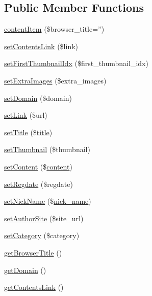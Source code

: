 \subsection*{Public Member Functions}
\begin{DoxyCompactItemize}
\item 
\hyperlink{classcontentItem_a6d43634cb803585fa2a0feb13f63fad4}{content\-Item} (\$browser\-\_\-title='')
\item 
\hyperlink{classcontentItem_afe78ae4ab14d74305c86d27570d9a7f8}{set\-Contents\-Link} (\$link)
\item 
\hyperlink{classcontentItem_ab18307a6068a6cdde94369976fe730f4}{set\-First\-Thumbnail\-Idx} (\$first\-\_\-thumbnail\-\_\-idx)
\item 
\hyperlink{classcontentItem_a8f635dff719c18bf5e969b13ca901c74}{set\-Extra\-Images} (\$extra\-\_\-images)
\item 
\hyperlink{classcontentItem_a61b6be878a0183cd1c3dfde8f29d5c20}{set\-Domain} (\$domain)
\item 
\hyperlink{classcontentItem_aad5f15eead8728ad5e2636740c4ff145}{set\-Link} (\$url)
\item 
\hyperlink{classcontentItem_a5a29426d7878c413cd6d63e930ce0a0f}{set\-Title} (\$\hyperlink{ko_8install_8php_a5b072c5fd1d2228c6ba5cee13cd142e3}{title})
\item 
\hyperlink{classcontentItem_a0145a758535658fa776871bfd675be15}{set\-Thumbnail} (\$thumbnail)
\item 
\hyperlink{classcontentItem_ad7355ad724398f4fbc79832241767405}{set\-Content} (\$\hyperlink{classcontent}{content})
\item 
\hyperlink{classcontentItem_abb2dad632dd405213708d5c211518c82}{set\-Regdate} (\$regdate)
\item 
\hyperlink{classcontentItem_ae3175aa0291e75bf95cb1220e50a33e4}{set\-Nick\-Name} (\$\hyperlink{ko_8install_8php_a151ecae87a1f3d7e257aa089803086bd}{nick\-\_\-name})
\item 
\hyperlink{classcontentItem_af28f4f40f1ac95cee2d88fe1e7d4b683}{set\-Author\-Site} (\$site\-\_\-url)
\item 
\hyperlink{classcontentItem_aa8ba578ae6629d632a42a76da823c59f}{set\-Category} (\$category)
\item 
\hyperlink{classcontentItem_a1590559deb019ba22a637cf78408f242}{get\-Browser\-Title} ()
\item 
\hyperlink{classcontentItem_a7a513d119938877566418029c6124a45}{get\-Domain} ()
\item 
\hyperlink{classcontentItem_a80a161de842f1a890fdbfee439674881}{get\-Contents\-Link} ()

\end{DoxyCompactItemize}
